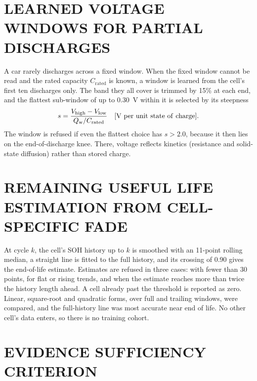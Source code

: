 \section{LEARNED VOLTAGE WINDOWS FOR PARTIAL DISCHARGES}
\label{sec:learned}

A car rarely discharges across a fixed window. When the fixed window cannot be read and the rated capacity $C_\mathrm{rated}$ is known, a window is learned from the cell's first ten discharges only. The band they all cover is trimmed by 15\% at each end, and the flattest sub-window of up to 0.30~V within it is selected by its steepness
\begin{equation}
s = \frac{V_\mathrm{high}-V_\mathrm{low}}{Q_{\mathrm{w}}/C_\mathrm{rated}}
\quad [\mathrm{V\ per\ unit\ state\ of\ charge}] .
\label{eq:steep}
\end{equation}
The window is refused if even the flattest choice has $s > 2.0$, because it then lies on the end-of-discharge knee. There, voltage reflects kinetics (resistance and solid-state diffusion) rather than stored charge.

\section{REMAINING USEFUL LIFE ESTIMATION FROM CELL-SPECIFIC FADE}
\label{sec:rul-method}

At cycle $k$, the cell's SOH history up to $k$ is smoothed with an 11-point rolling median, a straight line is fitted to the full history, and its crossing of 0.90 gives the end-of-life estimate. Estimates are refused in three cases: with fewer than 30 points, for flat or rising trends, and when the estimate reaches more than twice the history length ahead. A cell already past the threshold is reported as zero. Linear, square-root and quadratic forms, over full and trailing windows, were compared, and the full-history line was most accurate near end of life. No other cell's data enters, so there is no training cohort.

\section{EVIDENCE SUFFICIENCY CRITERION}
\label{sec:suff-method}

